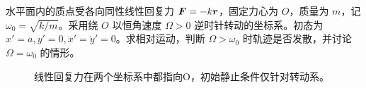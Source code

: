 \begin{example}[科里奥利耦合与表观势能]\label{rot:problem-example-10}\label{rot:ex:d6-e10}
水平面内的质点受各向同性线性回复力 $\bm{F}=-k\bm{r}$，固定力心为 $O$，质量为 $m$，记 $\omega_0=\sqrt{k/m}$。采用绕 $O$ 以恒角速度 $\Omega>0$ 逆时针转动的坐标系。初态为 $x'=a,y'=0,\dot x'=\dot y'=0$。求相对运动，判断 $\Omega>\omega_0$ 时轨迹是否发散，并讨论 $\Omega=\omega_0$ 的情形。
\end{example}
\begin{figure}[H]\centering
{}
\caption{线性回复力在两个坐标系中都指向O，初始静止条件仅针对转动系。}\label{rot:fig:d6-e10-q}
\end{figure}
